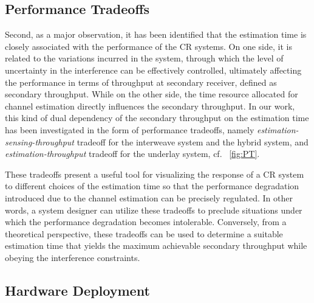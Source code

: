 \subsection*{Performance Tradeoffs}
Second, as a major observation, it has been identified that the estimation time is closely associated with the performance of the CR systems. On one side, it is related to the variations incurred in the system, through which the level of uncertainty in the interference can be effectively controlled, ultimately affecting the performance in terms of throughput at secondary receiver, defined as secondary throughput. While on the other side, the time resource allocated for channel estimation directly influences the secondary throughput. In our work, this kind of dual dependency of the secondary throughput on the estimation time has been investigated in the form of performance tradeoffs, namely \textit{estimation-sensing-throughput} tradeoff for the interweave system and the hybrid system, and \textit{estimation-throughput} tradeoff for the underlay system, cf. \figurename~\ref{fig:PT}. 

These tradeoffs present a useful tool for visualizing the response of a CR system to different choices of the estimation time so that the performance degradation introduced due to the channel estimation can be precisely regulated. In other words, a system designer can utilize these tradeoffs to preclude situations under which the performance degradation becomes intolerable. Conversely, from a theoretical perspective, these tradeoffs can be used to determine a suitable estimation time that yields the maximum achievable secondary throughput while obeying the interference constraints. 

\subsection*{Hardware Deployment}

